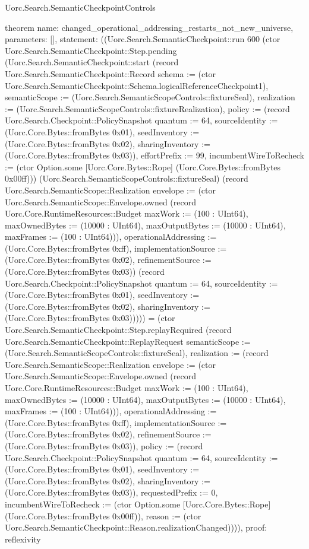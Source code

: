\begin{lexlean}{Uorc.Search.SemanticCheckpointControls}
\begin{semanticmodule}
theorem{
  name: changed_operational_addressing_restarts_not_new_universe,
  parameters: [],
  statement: ((Uorc.Search.SemanticCheckpoint::run 600 (ctor Uorc.Search.SemanticCheckpoint::Step.pending (Uorc.Search.SemanticCheckpoint::start (record Uorc.Search.SemanticCheckpoint::Record {schema := (ctor Uorc.Search.SemanticCheckpoint::Schema.logicalReferenceCheckpoint1), semanticScope := (Uorc.Search.SemanticScopeControls::fixtureSeal), realization := (Uorc.Search.SemanticScopeControls::fixtureRealization), policy := (record Uorc.Search.Checkpoint::PolicySnapshot {quantum := 64, sourceIdentity := (Uorc.Core.Bytes::fromBytes 0x01), seedInventory := (Uorc.Core.Bytes::fromBytes 0x02), sharingInventory := (Uorc.Core.Bytes::fromBytes 0x03)}), effortPrefix := 99, incumbentWireToRecheck := (ctor Option.some [Uorc.Core.Bytes::Rope] (Uorc.Core.Bytes::fromBytes 0x00ff))}) (Uorc.Search.SemanticScopeControls::fixtureSeal) (record Uorc.Search.SemanticScope::Realization {envelope := (ctor Uorc.Search.SemanticScope::Envelope.owned (record Uorc.Core.RuntimeResources::Budget {maxWork := (100 : UInt64), maxOwnedBytes := (10000 : UInt64), maxOutputBytes := (10000 : UInt64), maxFrames := (100 : UInt64)})), operationalAddressing := (Uorc.Core.Bytes::fromBytes 0xff), implementationSource := (Uorc.Core.Bytes::fromBytes 0x02), refinementSource := (Uorc.Core.Bytes::fromBytes 0x03)}) (record Uorc.Search.Checkpoint::PolicySnapshot {quantum := 64, sourceIdentity := (Uorc.Core.Bytes::fromBytes 0x01), seedInventory := (Uorc.Core.Bytes::fromBytes 0x02), sharingInventory := (Uorc.Core.Bytes::fromBytes 0x03)})))) = (ctor Uorc.Search.SemanticCheckpoint::Step.replayRequired (record Uorc.Search.SemanticCheckpoint::ReplayRequest {semanticScope := (Uorc.Search.SemanticScopeControls::fixtureSeal), realization := (record Uorc.Search.SemanticScope::Realization {envelope := (ctor Uorc.Search.SemanticScope::Envelope.owned (record Uorc.Core.RuntimeResources::Budget {maxWork := (100 : UInt64), maxOwnedBytes := (10000 : UInt64), maxOutputBytes := (10000 : UInt64), maxFrames := (100 : UInt64)})), operationalAddressing := (Uorc.Core.Bytes::fromBytes 0xff), implementationSource := (Uorc.Core.Bytes::fromBytes 0x02), refinementSource := (Uorc.Core.Bytes::fromBytes 0x03)}), policy := (record Uorc.Search.Checkpoint::PolicySnapshot {quantum := 64, sourceIdentity := (Uorc.Core.Bytes::fromBytes 0x01), seedInventory := (Uorc.Core.Bytes::fromBytes 0x02), sharingInventory := (Uorc.Core.Bytes::fromBytes 0x03)}), requestedPrefix := 0, incumbentWireToRecheck := (ctor Option.some [Uorc.Core.Bytes::Rope] (Uorc.Core.Bytes::fromBytes 0x00ff)), reason := (ctor Uorc.Search.SemanticCheckpoint::Reason.realizationChanged)}))),
  proof: reflexivity{}
}


\end{semanticmodule}
\end{lexlean}
